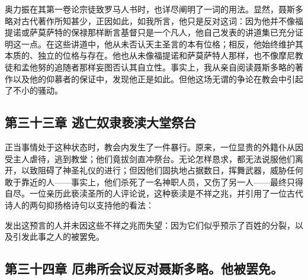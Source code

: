 奥力振在其第一卷论宗徒致罗马人书时，也详尽阐明了一词的用法。显然，聂斯多略对古代著作所知甚少，正因如此，如我所言，他只是反对这词：因为他并不像福提诺或萨莫萨特的保禄那样断言基督只是一个凡人，他自己发表的讲道集已充分证明这一点。在这些讲道中，他从未否认天主圣言的本有位格；相反，他始终维护其本质的、独立的位格与存在。他也从未像福提诺和萨莫萨特人那样，也不像摩尼教徒和孟他努的追随者那样妄图否认其自立性。事实上，我从亲自阅读聂斯多略的著作以及他的仰慕者的保证中，发现他正是如此。但他这场无谓的争论在教会中引起了不小的骚动。\par


\subsection{第三十三章 逃亡奴隶亵渎大堂祭台}

正当事情处于这种状态时，教会内发生了一件暴行。原来，一位显贵的外籍仆从因受主人虐待，逃到教堂；他们竟拔剑直冲祭台。无论怎样恳求，都无法说服他们离开，以致阻碍了神圣礼仪的进行；但因他们固执地占据数日，挥舞武器，威胁任何敢于靠近的人——事实上，他们杀死了一名神职人员，又伤了另一人——最终只得自尽。一位亲历此亵渎圣所的人评论说，这种亵渎是不祥之兆，并引用了一位古代诗人的两句抑扬格诗句以支持他的看法：\par

\par

发出这预言的人并未因这些不祥之兆而失望：因为它们似乎预示了百姓的分裂，以及引发此事之人的被罢免。\par


\subsection{第三十四章 厄弗所会议反对聂斯多略。他被罢免。}

